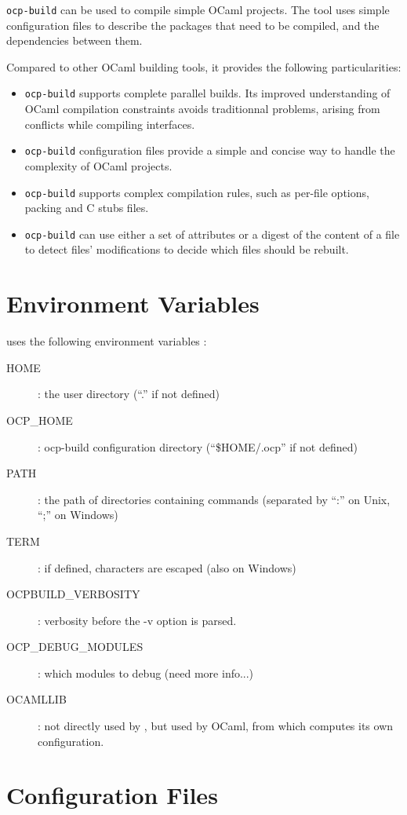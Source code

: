 
{\tt ocp-build} can be used to compile simple OCaml projects.
The tool uses simple configuration files to describe the
packages that need to be compiled, and the dependencies between
them.

Compared to other OCaml building tools, it provides the following
particularities:
\begin{itemize}
\item {\tt ocp-build} supports complete parallel builds. Its improved
  understanding of OCaml compilation constraints avoids traditionnal
  problems, arising from conflicts while compiling interfaces.
\item {\tt ocp-build} configuration files provide a simple and concise
  way to handle the complexity of OCaml projects.
\item {\tt ocp-build} supports complex compilation rules, such as
  per-file options, packing and C stubs files.
\item {\tt ocp-build} can use either a set of attributes or a digest
  of the content of a file to detect files' modifications to decide
  which files should be rebuilt.
\end{itemize}

\section{Environment Variables}

\ocpbuild{} uses the following environment variables :
\begin{description}
\item[HOME] : the user directory (``.'' if not defined)
\item[OCP\_HOME] : ocp-build configuration directory (``\$HOME/.ocp''
  if not defined)
\item[PATH] : the path of directories containing commands (separated
  by ``:'' on Unix, ``;'' on Windows)
\item[TERM] : if defined, characters are escaped (also on Windows)
\item[OCPBUILD\_VERBOSITY] : verbosity before the -v option is parsed.
\item[OCP\_DEBUG\_MODULES] : which modules to debug (need more info...)
\item[OCAMLLIB] : not directly used by \ocpbuild{}, but used by OCaml,
  from which \ocpbuild{} computes its own configuration.
\end{description}

\section{Configuration Files}

